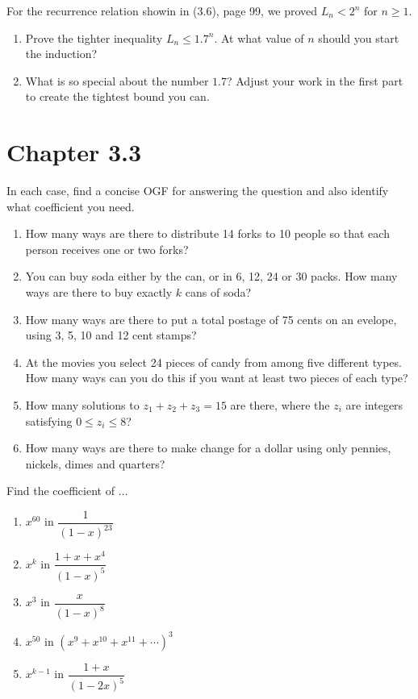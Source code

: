 \documentclass{article}
\begin{document}
\setcounter{problem}{8}
\begin{problem} %
For the recurrence relation showin in (3.6), page 99, we proved $L_n < 2^n$ for $n \ge 1$.
\begin{enumerate}
    \item Prove the tighter inequality $L_n \le 1.7^n$. At what value of $n$ should you start the induction?
    \item What is so special about the number $1.7$? Adjust your work in the first part to create the tightest bound you can.
\end{enumerate}
\end{problem}

\section{Chapter 3.3}
\setcounter{problem}{1}
\begin{problem} %
    In each case, find a concise OGF for answering the question and also identify what coefficient you need.
    \begin{enumerate}
        \item How many ways are there to distribute 14 forks to 10 people so that each person receives one or two forks?
        \item You can buy soda either by the can, or in 6, 12, 24 or 30 packs. How many ways are there to buy exactly $k$ cans of soda?
        \item How many ways are there to put a total postage of 75 cents on an evelope, using 3, 5, 10 and 12 cent stamps?
        \item At the movies you select 24 pieces of candy from among five different types. How many ways can you do this if you want at least two pieces of each type?
        \item How many solutions to $z_1 +z_2 + z_3 =15$ are there, where the $z_i$ are integers satisfying $0 \le z_i \le 8$?
        \item How many ways are there to make change for a dollar using only pennies, nickels, dimes and quarters?
    \end{enumerate}
\end{problem}

\begin{problem}%
    Find the coefficient of $\dots$
    \begin{enumerate}
        \item $x^{60}$ in $\dfrac{1}{(1-x)^{23}}$
        \item $x^{k}$ in $\dfrac{1+x+x^4}{(1-x)^5}$
        \item $x^{3}$ in $\dfrac{x}{(1-x)^8}$
        \item $x^{50}$ in $(x^9 + x^{10} + x^{11} + \cdots)^3$
        \item $x^{k-1}$ in $\dfrac{1 + x}{(1-2x)^5}$
    \end{enumerate}
\end{problem}
\end{document}
